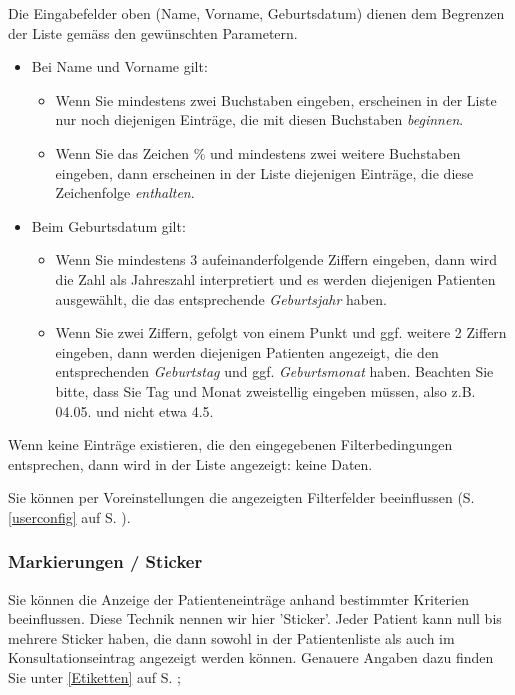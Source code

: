 Die Eingabefelder oben (Name, Vorname, Geburtsdatum) dienen dem Begrenzen der
Liste gemäss den gewünschten Parametern.
\begin{itemize}
  \item Bei Name und Vorname gilt:
	\begin{itemize}
      \item Wenn Sie mindestens zwei Buchstaben eingeben, erscheinen in der
      Liste nur noch diejenigen Einträge, die mit diesen Buchstaben \textit{beginnen}.
      \item Wenn Sie das Zeichen \% und mindestens zwei weitere Buchstaben
      eingeben, dann erscheinen in der Liste diejenigen Einträge, die diese
      Zeichenfolge \textit{enthalten}.
    \end{itemize}
  \item Beim Geburtsdatum gilt:
	\begin{itemize}
      \item Wenn Sie mindestens 3 aufeinanderfolgende Ziffern eingeben, dann wird
      die Zahl als Jahreszahl interpretiert und es werden diejenigen Patienten
      ausgewählt, die das entsprechende \textit{Geburtsjahr} haben.
      \item Wenn Sie zwei Ziffern, gefolgt von einem Punkt und ggf. weitere 2
      Ziffern eingeben, dann werden diejenigen Patienten angezeigt, die den
      entsprechenden \textit{Geburtstag} und ggf. \textit{Geburtsmonat} haben.
      Beachten Sie bitte, dass Sie Tag und Monat zweistellig eingeben müssen,
      also z.B. 04.05. und nicht etwa 4.5.
     \end{itemize}
\end{itemize}
Wenn keine Einträge existieren, die den eingegebenen Filterbedingungen
entsprechen, dann wird in der Liste angezeigt: \glqq keine Daten\grqq.

\medskip
{} 
Sie können per Voreinstellungen die angezeigten Filterfelder beeinflussen (S. \ref{userconfig} auf S. \pageref{userconfig}).

\subsubsection{Markierungen / Sticker}
Sie können die Anzeige der Patienteneinträge anhand bestimmter Kriterien beeinflussen. Diese Technik nennen wir hier 'Sticker'. Jeder Patient kann null bis mehrere Sticker haben, die dann sowohl in der Patientenliste als auch im Konsultationseintrag angezeigt werden können. Genauere Angaben dazu finden Sie unter \ref{Etiketten} auf S. \pageref{Etiketten};

